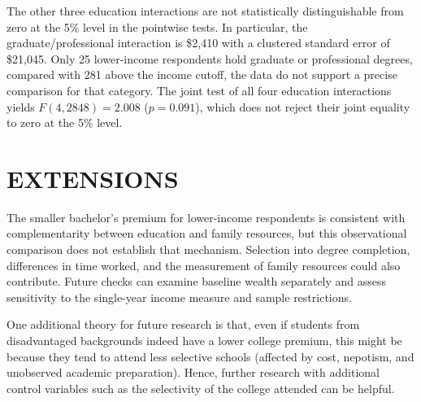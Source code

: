 \documentclass[12pt,letterpaper]{article}
\begin{document}
The other three education interactions are not statistically distinguishable from
zero at the 5\% level in the pointwise tests. In particular, the graduate/professional
interaction is \$2,410 with a clustered standard error of \$21,045. Only 25
lower-income respondents hold graduate or professional degrees, compared with
281 above the income cutoff, the data do not support a precise comparison for
that category. The joint test of all four education interactions yields
$F(4,2848)=2.008$ ($p=0.091$), which does not reject their joint equality to zero
at the 5\% level.\newline

\section*{EXTENSIONS}
The smaller bachelor's premium for lower-income respondents is consistent with
complementarity between education and family resources, but this observational
comparison does not establish that mechanism. Selection into degree completion,
differences in time worked, and the measurement of family resources could also
contribute. Future checks can examine baseline wealth separately and assess
sensitivity to the single-year income measure and sample restrictions.\newline

One additional theory for future research is that, even if students from disadvantaged
backgrounds indeed have a lower college premium, this might be because they tend to
attend less selective schools (affected by cost, nepotism, and unobserved academic
preparation). Hence, further research with additional control variables such as the
selectivity of the college attended can be helpful.
\end{document}
